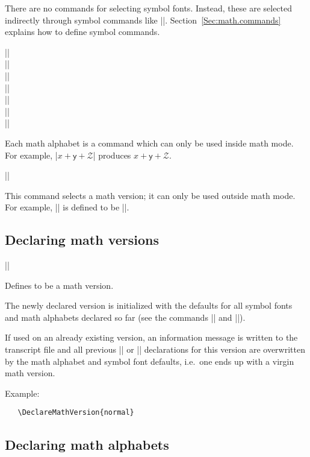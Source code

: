 \documentclass{ltxguide}[1995/11/28]
\begin{document}
There are no commands for selecting symbol fonts.  Instead, these are
selected indirectly through symbol commands like |\oplus|.
Section~\ref{Sec:math.commands} explains how to define symbol commands.
 
\begin{decl}
      ||\\
      ||\\
      ||\\
      ||\\
      ||\\
      ||\\
      ||
\end{decl}
Each math alphabet is a command which can only be used inside math
mode.  For example, |$x + \mathsf{y} + \mathcal{Z}$| produces $x +
\mathsf{y} + \mathcal{Z}$.
 
\begin{decl}
||
\end{decl}
This command selects a math version; it can only be used outside math
mode.  For example, |\boldmath| is defined to be ||.
 
\subsection{Declaring math versions}
 
\begin{decl}
|\DeclareMathVersion| 
\end{decl}
 
Defines  to be a math version.
 
The newly declared version is initialized with the defaults for all
symbol fonts and math alphabets declared so far (see the commands
|\DeclareSymbolFont| and |\DeclareMathAlphabet|).
 
If used on an already existing version, an information message is
written to the transcript file and all previous |\SetSymbolFont| or
|\SetMathAlphabet| declarations for this version are overwritten by
the math alphabet and symbol font defaults, i.e.~one ends up with a
virgin math version.
 
Example:
\begin{verbatim}
   \DeclareMathVersion{normal}
\end{verbatim}
 
 
\subsection{Declaring math alphabets}
\end{document}
